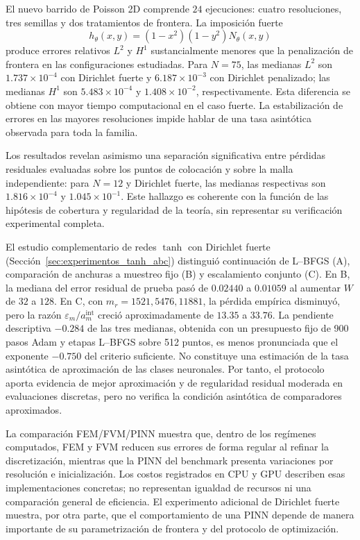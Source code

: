 El nuevo barrido de Poisson 2D comprende $24$ ejecuciones: cuatro resoluciones, tres semillas y dos tratamientos de frontera. La imposición fuerte
\[
  h_\theta(x,y)=(1-x^2)(1-y^2)N_\theta(x,y)
\]
produce errores relativos $L^2$ y $H^1$ sustancialmente menores que la penalización de frontera en las configuraciones estudiadas. Para $N=75$, las medianas $L^2$ son $1.737\times10^{-4}$ con Dirichlet fuerte y $6.187\times10^{-3}$ con Dirichlet penalizado; las medianas $H^1$ son $5.483\times10^{-4}$ y $1.408\times10^{-2}$, respectivamente. Esta diferencia se obtiene con mayor tiempo computacional en el caso fuerte. La estabilización de errores en las mayores resoluciones impide hablar de una tasa asintótica observada para toda la familia.

Los resultados revelan asimismo una separación significativa entre pérdidas residuales evaluadas sobre los puntos de colocación y sobre la malla independiente: para $N=12$ y Dirichlet fuerte, las medianas respectivas son $1.816\times10^{-4}$ y $1.045\times10^{-1}$. Este hallazgo es coherente con la función de las hipótesis de cobertura y regularidad de la teoría, sin representar su verificación experimental completa.

El estudio complementario de redes $\tanh$ con Dirichlet fuerte
(Sección~\ref{sec:experimentos_tanh_abc}) distinguió continuación de
L--BFGS (A), comparación de anchuras a muestreo fijo (B) y escalamiento
conjunto (C). En B, la mediana del error residual de prueba pasó de
$0.02440$ a $0.01059$ al aumentar $W$ de $32$ a $128$. En C, con
$m_r=1521,5476,11881$, la pérdida empírica disminuyó, pero la razón
$\varepsilon_m/a_m^{\mathrm{int}}$ creció aproximadamente de $13.35$ a
$33.76$. La pendiente descriptiva $-0.284$ de las tres medianas, obtenida con
un presupuesto fijo de 900 pasos Adam y etapas L--BFGS sobre 512
puntos, es menos pronunciada que el exponente $-0.750$ del criterio
suficiente. No constituye una estimación de la tasa asintótica de
aproximación de las clases neuronales.
Por tanto, el protocolo aporta evidencia de mejor aproximación y de
regularidad residual moderada en evaluaciones discretas, pero no
verifica la condición asintótica de comparadores aproximados.

La comparación FEM/FVM/PINN muestra que, dentro de los regímenes computados, FEM y FVM reducen sus errores de forma regular al refinar la discretización, mientras que la PINN del benchmark presenta variaciones por resolución e inicialización. Los costos registrados en CPU y GPU describen esas implementaciones concretas; no representan igualdad de recursos ni una comparación general de eficiencia. El experimento adicional de Dirichlet fuerte muestra, por otra parte, que el comportamiento de una PINN depende de manera importante de su parametrización de frontera y del protocolo de optimización.

